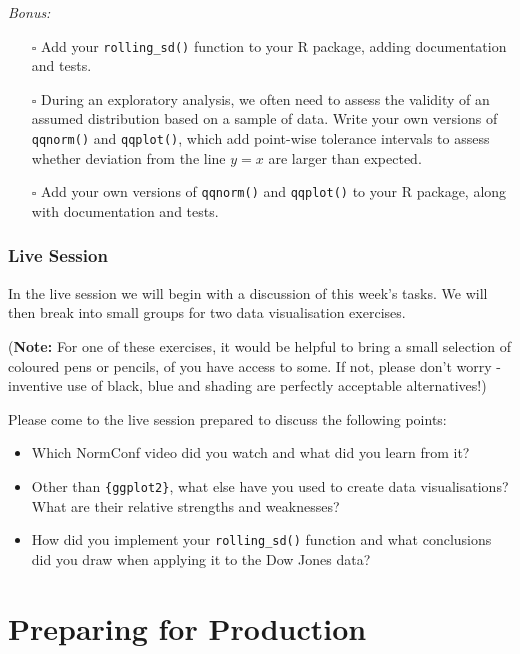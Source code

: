 \documentclass[
  letterpaper,
  DIV=11,
  numbers=noendperiod]{scrreprt}
\begin{document}
\emph{Bonus:}

\begin{itemize}
\item[$\square$]
  Add your \texttt{rolling\_sd()} function to your R package, adding
  documentation and tests.
\item[$\square$]
  During an exploratory analysis, we often need to assess the validity
  of an assumed distribution based on a sample of data. Write your own
  versions of \texttt{qqnorm()} and \texttt{qqplot()}, which add
  point-wise tolerance intervals to assess whether deviation from the
  line \(y=x\) are larger than expected.
\item[$\square$]
  Add your own versions of \texttt{qqnorm()} and \texttt{qqplot()} to
  your R package, along with documentation and tests.
\end{itemize}

\section*{Live Session}\label{live-session-2}


In the live session we will begin with a discussion of this week's
tasks. We will then break into small groups for two data visualisation
exercises.

(\textbf{Note:} For one of these exercises, it would be helpful to bring
a small selection of coloured pens or pencils, of you have access to
some. If not, please don't worry - inventive use of black, blue and
shading are perfectly acceptable alternatives!)

Please come to the live session prepared to discuss the following
points:

\begin{itemize}
\item
  Which NormConf video did you watch and what did you learn from it?
\item
  Other than \texttt{\{ggplot2\}}, what else have you used to create
  data visualisations? What are their relative strengths and weaknesses?
\item
  How did you implement your \texttt{rolling\_sd()} function and what
  conclusions did you draw when applying it to the Dow Jones data?
\end{itemize}

\part{Preparing for Production}
\end{document}
